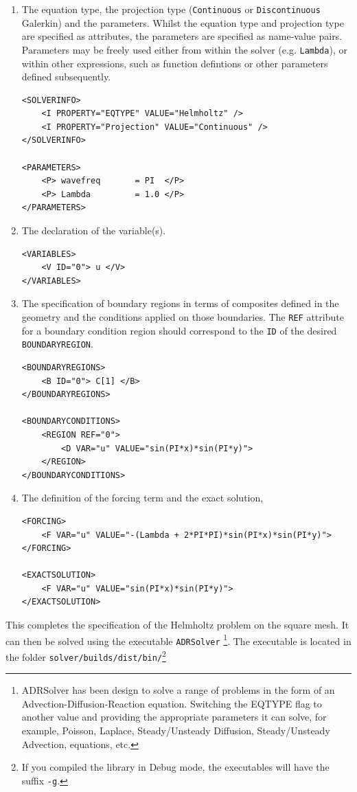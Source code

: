 \documentclass[a4paper,12pt]{article}
\begin{document}
\begin{enumerate}
\item The equation type, the projection type (\texttt{Continuous} or
\texttt{Discontinuous} Galerkin) and the parameters. Whilst the equation type
and projection type are specified as attributes, the parameters are specified as
name-value pairs. Parameters may be freely used either from within the solver
(e.g. \texttt{Lambda}), or within other expressions, such as function defintions
or other parameters defined subsequently.
\begin{verbatim}
<SOLVERINFO>
    <I PROPERTY="EQTYPE" VALUE="Helmholtz" />
    <I PROPERTY="Projection" VALUE="Continuous" />
</SOLVERINFO>

<PARAMETERS>
    <P> wavefreq       = PI  </P>
    <P> Lambda         = 1.0 </P>
</PARAMETERS>
\end{verbatim}

\item The declaration of the variable(s).  
\begin{verbatim}
<VARIABLES>
    <V ID="0"> u </V> 
</VARIABLES>
\end{verbatim}

\item The specification of boundary regions in terms of composites defined in
the geometry and the conditions applied on those boundaries. The \texttt{REF}
attribute for a boundary condition region should correspond to the \texttt{ID}
of the desired \texttt{BOUNDARYREGION}.
\begin{verbatim}
<BOUNDARYREGIONS>
    <B ID="0"> C[1] </B>
</BOUNDARYREGIONS>

<BOUNDARYCONDITIONS>
    <REGION REF="0">
        <D VAR="u" VALUE="sin(PI*x)*sin(PI*y)">
    </REGION>
</BOUNDARYCONDITIONS>
\end{verbatim}

\item The definition of the forcing term and the exact solution,
\begin{verbatim}
<FORCING>
    <F VAR="u" VALUE="-(Lambda + 2*PI*PI)*sin(PI*x)*sin(PI*y)">
</FORCING>
       
<EXACTSOLUTION>
    <F VAR="u" VALUE="sin(PI*x)*sin(PI*y)">
</EXACTSOLUTION>
\end{verbatim}
\end{enumerate}

This completes the specification of the Helmholtz problem on the square mesh.
It can then be solved using the executable \texttt{ADRSolver}
\footnote{ADRSolver has been design to solve a range of problems in the form of
an Advection-Diffusion-Reaction equation. Switching the EQTYPE flag to
another value and providing the appropriate parameters it can solve, for
example, Poisson, Laplace, Steady/Unsteady Diffusion, Steady/Unsteady Advection,
equations, etc.}. The executable is located in the folder
\texttt{solver/builds/dist/bin/}\footnote{If you compiled the library in Debug
mode, the executables will have the suffix \texttt{-g}.}
\end{document}

